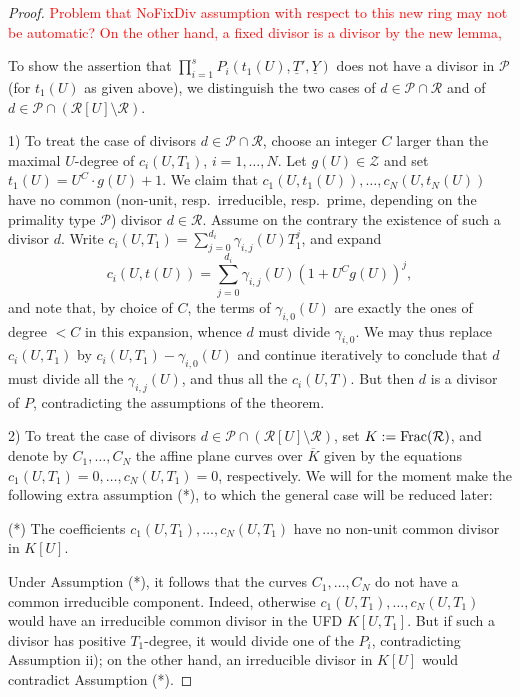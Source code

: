 \documentclass[11pt,a4paper,reqno]{amsart}
\theoremstyle{definition}
\begin{document}
\begin{proof}
\textcolor{red}{Problem that NoFixDiv assumption with respect to this new ring may not be automatic? On the other hand, a fixed divisor is a divisor by the new lemma, }
\fi


To show the assertion that $\prod_{i=1}^s P_i(t_1(U),\underline{T}',\underline{Y})$ does not have a divisor in $\mathcal{P}$ (for $t_1(U)$ as given above), we distinguish the two cases of $d\in \mathcal{P}\cap \mathcal R$ and of $d\in \mathcal{P}\cap(\mathcal R[U]\setminus \mathcal R)$.

1) To treat the case of divisors $d\in \mathcal{P}\cap \mathcal{R}$,  choose an integer $C$ larger than the maximal $U$-degree of $c_i(U,T_1)$, $i=1,\dots, N$. Let $g(U)\in \mathcal{Z}$ and set $t_1(U) = U^C\cdot g(U) + 1$. We claim that $c_1(U,t_1(U)),\dots, c_N(U,t_N(U))$ have no common (non-unit, resp.\ irreducible, resp.\ prime, depending on the primality type $\mathcal{P}$) divisor $d\in \mathcal{R}$. Assume on the contrary the existence of such a divisor $d$. Write $c_i(U,T_1) = \sum_{j=0}^{d_i}\gamma_{i,j}(U) T_1^j$, and expand $$c_i(U,t(U)) = \sum_{j=0}^{d_i}\gamma_{i,j}(U) (1+U^C g(U))^j,$$ %
and note that, by choice of $C$, the terms of $\gamma_{i,0}(U)$ are exactly the ones of degree $<C$ in this expansion, whence $d$ must divide $\gamma_{i,0}$. We may thus replace $c_i(U,T_1)$ by $c_i(U,T_1)-\gamma_{i,0}(U)$ and continue iteratively to conclude that $d$ must divide all the $\gamma_{i,j}(U)$, and thus all the $c_i(U,T)$. But then $d$ is a divisor of $P$, contradicting the assumptions of the theorem.

2) To treat the case of divisors $d\in \mathcal{P}\cap(\mathcal R[U]\setminus \mathcal R)$, set $K:={\rm Frac}(\mathcal{R})$, and denote by $C_1,\dots, C_N$ the affine plane curves over $\overline{K}$ given by the equations $c_1(U,T_1)=0,\dots, c_N(U,T_1)=0$, respectively. 
We will for the moment make the following extra assumption (*), to which the general case will be reduced later:

\begin{center}
(*) The coefficients $c_1(U,T_1),\dots, c_N(U,T_1)$ have no non-unit common divisor in $K[U]$.
\end{center}

Under Assumption (*), it follows that the curves $C_1,\dots, C_N$ do not have a common irreducible component. Indeed, otherwise $c_1(U,T_1),\dots, c_N(U,T_1)$ would have an irreducible common divisor in the UFD $K[U,T_1]$. But if such a divisor has positive $T_1$-degree, it would divide one of the $P_i$, contradicting Assumption ii);
on the other hand, an irreducible divisor in $K[U]$ would 
contradict Assumption (*).


\end{proof}
\end{document}
